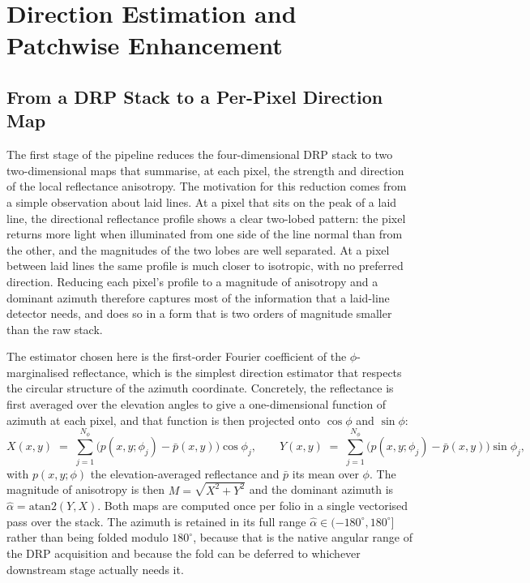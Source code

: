 \section{Direction Estimation and Patchwise Enhancement}
\label{sec:direction}


\subsection{From a DRP Stack to a Per-Pixel Direction Map}
\label{sec:direction:perpixel}

The first stage of the pipeline reduces the four-dimensional DRP stack
to two two-dimensional maps that summarise, at each pixel, the strength
and direction of the local reflectance anisotropy. The motivation for
this reduction comes from a simple observation about laid lines. At a
pixel that sits on the peak of a laid line, the directional reflectance
profile shows a clear two-lobed pattern: the pixel returns more light
when illuminated from one side of the line normal than from the other,
and the magnitudes of the two lobes are well separated. At a pixel
between laid lines the same profile is much closer to isotropic, with
no preferred direction. Reducing each pixel's profile to a magnitude
of anisotropy and a dominant azimuth therefore captures most of the
information that a laid-line detector needs, and does so in a form
that is two orders of magnitude smaller than the raw stack.

The estimator chosen here is the first-order Fourier coefficient of
the $\phi$-marginalised reflectance, which is the simplest direction
estimator that respects the circular structure of the azimuth
coordinate. Concretely, the reflectance is first averaged over the
elevation angles to give a one-dimensional function of azimuth at
each pixel, and that function is then projected onto $\cos\phi$ and
$\sin\phi$:
\begin{equation}
  X(x,y) \;=\; \sum_{j=1}^{N_\phi}
      \bigl(p(x,y;\phi_j) - \bar p(x,y)\bigr)\cos\phi_j ,
  \qquad
  Y(x,y) \;=\; \sum_{j=1}^{N_\phi}
      \bigl(p(x,y;\phi_j) - \bar p(x,y)\bigr)\sin\phi_j ,
  \label{eq:dir_fourier}
\end{equation}
with $p(x,y;\phi)$ the elevation-averaged reflectance and $\bar p$ its
mean over $\phi$. The magnitude of anisotropy is then $M = \sqrt{X^2 + Y^2}$
and the dominant azimuth is $\hat\alpha = \mathrm{atan2}(Y, X)$. Both
maps are computed once per folio in a single vectorised pass over the
stack. The azimuth is retained in its full range
$\hat\alpha \in (-180^\circ, 180^\circ]$ rather than being folded
modulo $180^\circ$, because that is the native angular range of the
DRP acquisition and because the fold can be deferred to whichever
downstream stage actually needs it.

